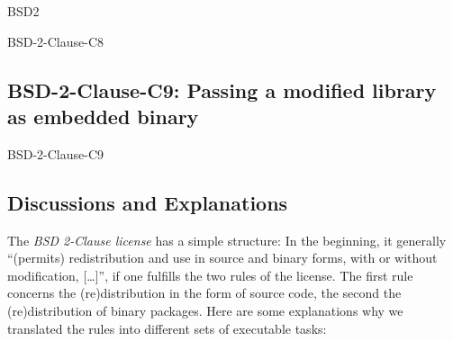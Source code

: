 \begin{license}{BSD2}
\begin{lsuc}{BSD-2-Clause-C8}
  \lsucprohibitsnothing
\end{lsuc}

\subsection{BSD-2-Clause-C9: Passing a modified library as embedded binary}
\begin{lsuc}{BSD-2-Clause-C9}

  \lsucmeans{\useCaseNine}
  \lsuccovers{\coversNine}

  \begin{lsucrequires}
    \lsucmandatory{\insertLicenseIntoBinary}\passingFilesCorrectly
    \lsucoptional{\addLibraryLicenseToCopyrightMessage}
    \lsucoptional{\keepBinariesSeparate}
  \end{lsucrequires}

  \lsucprohibitsnothing
\end{lsuc}

\end{license}


\subsection{Discussions and Explanations}
\label{BSD2Discussion}%
\label{BSD3Discussion}

The \textit{BSD 2-Clause license} has a simple structure: In the beginning, it
generally \enquote{(permits) redistribution and use in source and binary forms,
with or without modification, [\ldots]}, if one fulfills the two rules of the
license.\citeBSDsimple{} The first rule concerns the (re)distribution in the
form of source code, the second the (re)distribution of binary packages. Here are
some explanations why we translated the rules into different sets of executable
tasks:


